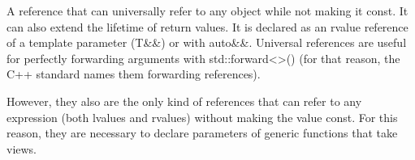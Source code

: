 


A reference that can universally refer to any object while not making it const. It can also extend the lifetime of return values. It is declared as an rvalue reference of a template parameter (T\&\&) or with auto\&\&. Universal references are useful for perfectly forwarding arguments with std::forward<>() (for that reason, the C++ standard names them forwarding references).

However, they also are the only kind of references that can refer to any expression (both lvalues and rvalues) without making the value const. For this reason, they are necessary to declare parameters of generic functions that take views.

